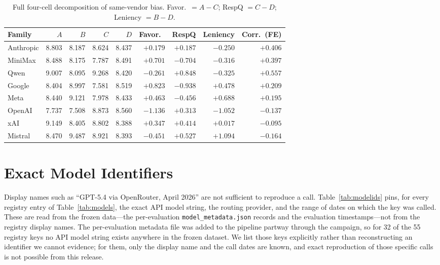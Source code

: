\documentclass{article}
\begin{document}
\begin{table}[h]
\centering
\caption{Full four-cell decomposition of same-vendor bias. Favor.\ $= A-C$; RespQ $= C-D$; Leniency $= B-D$.}
\label{tab:fourcell}
\begin{tabular}{lrrrrrrrr}
\toprule
Family & $A$ & $B$ & $C$ & $D$ & Favor.\ & RespQ & Leniency & Corr.\ (FE) \\
\midrule
Anthropic & 8.803 & 8.187 & 8.624 & 8.437 & $+0.179$ & $+0.187$ & $-0.250$ & $+0.406$ \\
MiniMax   & 8.488 & 8.175 & 7.787 & 8.491 & $+0.701$ & $-0.704$ & $-0.316$ & $+0.397$ \\
Qwen      & 9.007 & 8.095 & 9.268 & 8.420 & $-0.261$ & $+0.848$ & $-0.325$ & $+0.557$ \\
Google    & 8.404 & 8.997 & 7.581 & 8.519 & $+0.823$ & $-0.938$ & $+0.478$ & $+0.209$ \\
Meta      & 8.440 & 9.121 & 7.978 & 8.433 & $+0.463$ & $-0.456$ & $+0.688$ & $+0.195$ \\
OpenAI    & 7.737 & 7.508 & 8.873 & 8.560 & $-1.136$ & $+0.313$ & $-1.052$ & $-0.137$ \\
xAI       & 9.149 & 8.405 & 8.802 & 8.388 & $+0.347$ & $+0.414$ & $+0.017$ & $-0.095$ \\
Mistral   & 8.470 & 9.487 & 8.921 & 8.393 & $-0.451$ & $+0.527$ & $+1.094$ & $-0.164$ \\
\bottomrule
\end{tabular}
\end{table}

\section{Exact Model Identifiers}
\label{app:modelids}

Display names such as ``GPT-5.4 via OpenRouter, April 2026'' are not sufficient to reproduce a
call. Table~\ref{tab:modelids} pins, for every registry entry of Table~\ref{tab:models}, the exact
API model string, the routing provider, and the range of dates on which the key was called. These
are read from the frozen data---the per-evaluation \texttt{model\_metadata.json} records and the
evaluation timestamps---not from the registry display names. The per-evaluation metadata file was
added to the pipeline partway through the campaign, so for 32 of the 55 registry keys no API model
string exists anywhere in the frozen dataset. We list those keys explicitly rather than
reconstructing an identifier we cannot evidence; for them, only the display name and the call dates
are known, and exact reproduction of those specific calls is not possible from this release.


\end{document}
